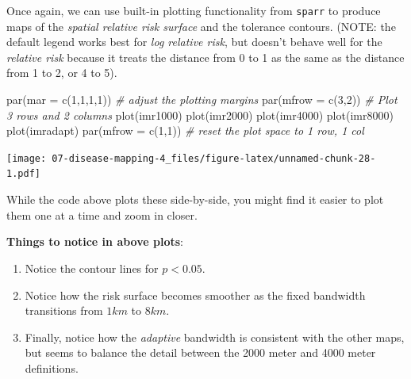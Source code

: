 \documentclass[
]{book}
\newenvironment{Shaded}{\begin{snugshade}}{\end{snugshade}}
\newcommand{\AttributeTok}[1]{\textcolor[rgb]{0.77,0.63,0.00}{#1}}
\newcommand{\CommentTok}[1]{\textcolor[rgb]{0.56,0.35,0.01}{\textit{#1}}}
\newcommand{\DecValTok}[1]{\textcolor[rgb]{0.00,0.00,0.81}{#1}}
\newcommand{\FunctionTok}[1]{\textcolor[rgb]{0.00,0.00,0.00}{#1}}
\newcommand{\NormalTok}[1]{#1}
\providecommand{\tightlist}{%
  \setlength{\itemsep}{0pt}\setlength{\parskip}{0pt}}
\newenvironment{rmdnote}[1]
  {
  \begin{itemize}
  \renewcommand{\labelitemi}{
    \raisebox{-.7\height}[0pt][0pt]{
      {\setkeys{Gin}{width=3em,keepaspectratio}\texttt{[image: images/\#1]}}
    }
  }
  \setlength{\fboxsep}{1em}
  \begin{note}
  \item
  }
  {
  \end{note}
  \end{itemize}
  }
\begin{document}
Once again, we can use built-in plotting functionality from \texttt{sparr} to produce maps of the \emph{spatial relative risk surface} and the tolerance contours. (NOTE: the default legend works best for \emph{log relative risk}, but doesn't behave well for the \emph{relative risk} because it treats the distance from 0 to 1 as the same as the distance from 1 to 2, or 4 to 5).

\begin{Shaded}
\begin{Highlighting}[]
\FunctionTok{par}\NormalTok{(}\AttributeTok{mar =} \FunctionTok{c}\NormalTok{(}\DecValTok{1}\NormalTok{,}\DecValTok{1}\NormalTok{,}\DecValTok{1}\NormalTok{,}\DecValTok{1}\NormalTok{)) }\CommentTok{\# adjust the plotting margins}
\FunctionTok{par}\NormalTok{(}\AttributeTok{mfrow =} \FunctionTok{c}\NormalTok{(}\DecValTok{3}\NormalTok{,}\DecValTok{2}\NormalTok{))   }\CommentTok{\# Plot 3 rows and 2 columns}
\FunctionTok{plot}\NormalTok{(imr1000)}
\FunctionTok{plot}\NormalTok{(imr2000)}
\FunctionTok{plot}\NormalTok{(imr4000)}
\FunctionTok{plot}\NormalTok{(imr8000)}
\FunctionTok{plot}\NormalTok{(imradapt)}
\FunctionTok{par}\NormalTok{(}\AttributeTok{mfrow =} \FunctionTok{c}\NormalTok{(}\DecValTok{1}\NormalTok{,}\DecValTok{1}\NormalTok{))  }\CommentTok{\# reset the plot space to 1 row, 1 col}
\end{Highlighting}
\end{Shaded}

\texttt{[image: 07-disease-mapping-4\_files/figure-latex/unnamed-chunk-28-1.pdf]}

While the code above plots these side-by-side, you might find it easier to plot them one at a time and zoom in closer.

\begin{rmdnote}{note}

\textbf{Things to notice in above plots}:

\begin{enumerate}
\def\labelenumi{\arabic{enumi}.}
\tightlist
\item
  Notice the contour lines for \(p<0.05\).\\
\item
  Notice how the risk surface becomes smoother as the fixed bandwidth transitions from \(1km\) to \(8km\).
\item
  Finally, notice how the \emph{adaptive} bandwidth is consistent with the other maps, but seems to balance the detail between the 2000 meter and 4000 meter definitions.
\end{enumerate}

\end{rmdnote}
\end{document}
